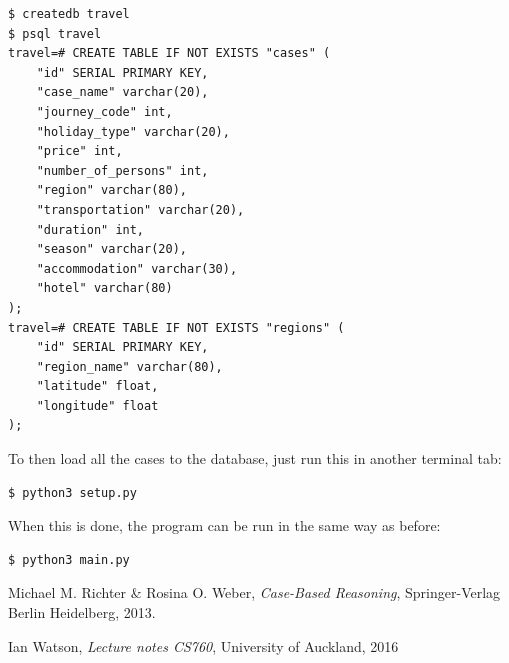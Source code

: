 \documentclass[12pt]{article}
\begin{document}
\begin{lstlisting}
$ createdb travel
$ psql travel
travel=# CREATE TABLE IF NOT EXISTS "cases" (
	"id" SERIAL PRIMARY KEY,
	"case_name" varchar(20),
	"journey_code" int,
	"holiday_type" varchar(20),
	"price" int,
	"number_of_persons" int,
	"region" varchar(80),
	"transportation" varchar(20),
	"duration" int,
	"season" varchar(20),
	"accommodation" varchar(30),
	"hotel" varchar(80)
);
travel=# CREATE TABLE IF NOT EXISTS "regions" (
	"id" SERIAL PRIMARY KEY,
	"region_name" varchar(80),
	"latitude" float,
	"longitude" float
);
\end{lstlisting}

To then load all the cases to the database, just run this in another terminal tab:

\begin{lstlisting}
$ python3 setup.py
\end{lstlisting}

When this is done, the program can be run in the same way as before:

\begin{lstlisting}
$ python3 main.py
\end{lstlisting}

\clearpage

\begin{thebibliography}{9}

Michael M. Richter \& Rosina O. Weber,
\emph{Case-Based Reasoning},
Springer-Verlag Berlin Heidelberg,
2013.

Ian Watson,
\emph{Lecture notes CS760},
University of Auckland,
2016


\end{thebibliography}
\end{document}
